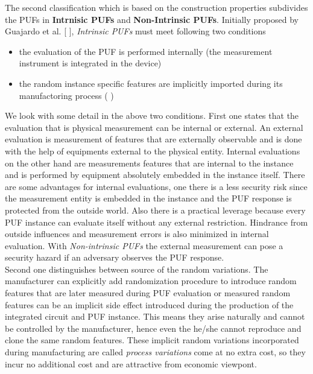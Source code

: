 The second classification which is based on the construction properties subdivides the PUFs in \textbf{Intrnisic PUFs} and \textbf{Non-Intrinsic PUFs}. Initially proposed by Guajardo et al. [ ], \emph{Intrinsic PUFs} must meet following two conditions
\begin{itemize}
	\item the evaluation of the PUF is performed internally (the measurement instrument is integrated in the device)
	\item the random instance specific features are implicitly imported during its manufactoring process ( )
\end{itemize}

We look with some detail in the above two conditions. First one states that the evaluation that is physical measurement can be internal or external. An external evaluation is measurement of features that are externally observable and is done with the help of equipments external to the physical entity. Internal evaluations on the other hand are measurements features that are internal to the instance and is performed by equipment absolutely embedded in the instance itself. There are some advantages for internal evaluations, one there is a less security risk since the measurement entity is embedded in the instance and the PUF response is protected from the outside world. Also there is a practical leverage because every PUF instance can evaluate itself without any external restriction. Hindrance from outside influences and measurement errors is also minimized in internal evaluation. With \emph{Non-intrinsic PUFs} the external measurement can pose a security
hazard if an adversary observes the PUF response.\\

Second one distinguishes between source of the random variations. The manufacturer can explicitly add randomization procedure to introduce random features that are later measured during PUF evaluation or measured random features can be an implicit side effect introduced during the production of the integrated circuit and PUF instance. This means they arise naturally and cannot be controlled by the manufacturer, hence even the he/she cannot reproduce and clone the same random features. These implicit random variations incorporated during manufacturing are called \emph{process variations} come at no extra cost, so they incur no additional cost and are attractive from economic viewpont.\\

